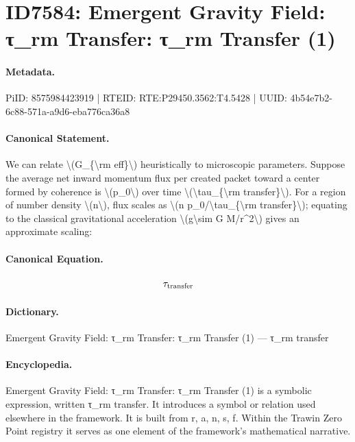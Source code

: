 \section*{ID7584: Emergent Gravity Field: τ\_rm Transfer: τ\_rm Transfer (1)}
\paragraph{Metadata.}
PiID: 8575984423919 | RTEID: RTE:P29450.3562:T4.5428 | UUID: 4b54e7b2-6c88-571a-a9d6-eba776ca36a8

\paragraph{Canonical Statement.}
We can relate \textbackslash{}(G\_\{\textbackslash{}rm eff\}\textbackslash{}) heuristically to microscopic parameters. Suppose the average net inward momentum flux per created packet toward a center formed by coherence is \textbackslash{}(p\_0\textbackslash{}) over time \textbackslash{}(\textbackslash{}tau\_\{\textbackslash{}rm transfer\}\textbackslash{}). For a region of number density \textbackslash{}(n\textbackslash{}), flux scales as \textbackslash{}(n p\_0/\textbackslash{}tau\_\{\textbackslash{}rm transfer\}\textbackslash{}); equating to the classical gravitational acceleration \textbackslash{}(g\textbackslash{}sim G M/r\textasciicircum{}2\textbackslash{}) gives an approximate scaling:

\paragraph{Canonical Equation.}
\[
\tau_{\rm transfer}
\]

\paragraph{Dictionary.}
Emergent Gravity Field: τ\_rm Transfer: τ\_rm Transfer (1) — τ\_rm transfer

\paragraph{Encyclopedia.}
Emergent Gravity Field: τ\_rm Transfer: τ\_rm Transfer (1) is a symbolic expression, written τ\_rm transfer. It introduces a symbol or relation used elsewhere in the framework. It is built from r, a, n, s, f. Within the Trawin Zero Point registry it serves as one element of the framework's mathematical narrative.
